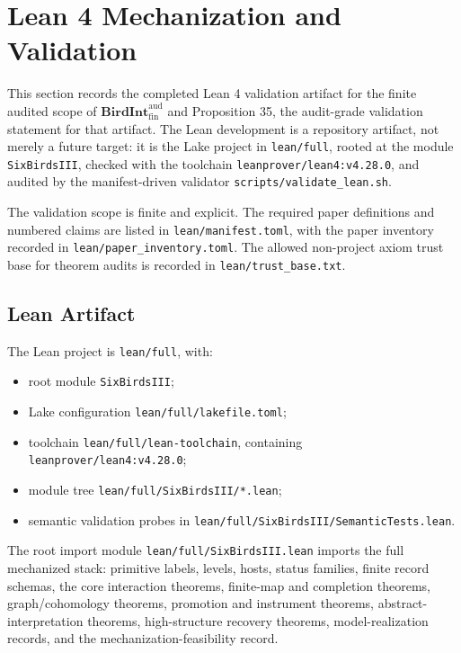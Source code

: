 \documentclass[11pt]{article}
\providecommand{\tightlist}{}
\theoremstyle{definition}
\begin{document}
 \section{Lean 4 Mechanization and Validation}

This section records the completed Lean 4 validation artifact for the finite audited scope of \(\mathbf{BirdInt}^{\mathrm{aud}}_{\mathrm{fin}}\) and Proposition 35, the audit-grade validation statement for that artifact. The Lean development is a repository artifact, not merely a future target: it is the Lake project in \texttt{lean/full}, rooted at the module \texttt{SixBirdsIII}, checked with the toolchain \texttt{leanprover/lean4:v4.28.0}, and audited by the manifest-driven validator \texttt{scripts/validate\_lean.sh}.

The validation scope is finite and explicit. The required paper definitions and numbered claims are listed in \texttt{lean/manifest.toml}, with the paper inventory recorded in \texttt{lean/paper\_inventory.toml}. The allowed non-project axiom trust base for theorem audits is recorded in \texttt{lean/trust\_base.txt}.

\subsection{Lean Artifact}

The Lean project is \texttt{lean/full}, with:

\begin{itemize}
\tightlist
\item
  root module \texttt{SixBirdsIII};
\item
  Lake configuration \texttt{lean/full/lakefile.toml};
\item
  toolchain \texttt{lean/full/lean-toolchain}, containing \texttt{leanprover/lean4:v4.28.0};
\item
  module tree \texttt{lean/full/SixBirdsIII/*.lean};
\item
  semantic validation probes in \texttt{lean/full/SixBirdsIII/SemanticTests.lean}.
\end{itemize}

The root import module \texttt{lean/full/SixBirdsIII.lean} imports the full mechanized stack: primitive labels, levels, hosts, status families, finite record schemas, the core interaction theorems, finite-map and completion theorems, graph/cohomology theorems, promotion and instrument theorems, abstract-interpretation theorems, high-structure recovery theorems, model-realization records, and the mechanization-feasibility record.
\end{document}
